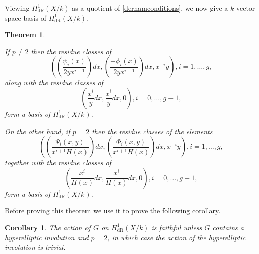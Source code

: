 \documentclass[11pt]{article} %
\theoremstyle{plain}
\newtheorem{thm}[defn]{Theorem}
\newtheorem{cor}[defn]{Corollary}
\theoremstyle{remark}
\newcommand{\derhamhone}{H_{\text {dR}}^1(X/k)}
\begin{document}
Viewing $\derhamhone$ as a quotient of \eqref{derhamconditions}, we now give a $k$-vector space basis of $\derhamhone$.
\begin{thm}\label{basis}

If $p \neq 2$ then the residue classes of 
\begin{equation}\label{one}
 \left( \left( \frac{\psi_i(x)}{2yx^{i+1}}\right) dx, \left(\frac{-\phi_i(x)}{2yx^{i+1}}\right) dx, x^{-i}y\right), i=1, \ldots ,g,
\end{equation}
along with the residue classes of 
\begin{equation}\label{two}
 \left( \frac{x^{i}}{y} dx , \frac{x^{i}}{y} dx, 0 \right), i = 0,\ldots ,g-1,
\end{equation}
form a basis of $\derhamhone$.

On the other hand, if $p=2$ then the residue classes of the elements 
\begin{equation}\label{three}
\left( \left(\frac{\Psi_i(x,y)}{x^{i+1}H(x)}\right) dx, \left( \frac{\Phi_i(x,y)}{x^{i+1}H(x)} \right) dx, x^{-i}y \right), i =1, \ldots , g,
\end{equation}
together with the residue classes of 
\begin{equation}\label{four}
\left( \frac{x^{i}}{H(x)} dx, \frac{x^{i}}{H(x)} dx, 0 \right), i=0, \ldots, g-1,
\end{equation}
form a basis of $\derhamhone$.
\end{thm}

Before proving this theorem we use it to prove the following corollary.

\begin{cor}
The action of $G$ on $\derhamhone$ is faithful unless $G$ contains a hyperelliptic involution and $p=2$, in which case the action of the hyperelliptic involution is trivial.
\end{cor}
\end{document}
